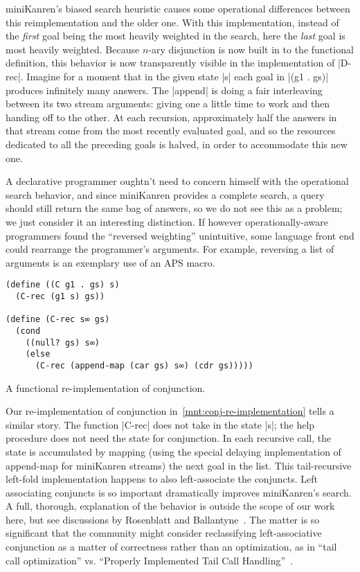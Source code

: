 \documentclass[sigplan,screen,draft,anonymous,review,natbib=false]{acmart}
\begin{document}
miniKanren's biased search heuristic causes some operational
differences between this reimplementation and the older one. With this
implementation, instead of the \emph{first} goal being the most
heavily weighted in the search, here the \emph{last} goal is most
heavily weighted. Because $n$-ary disjunction is now built in to the
functional definition, this behavior is now transparently visible in
the implementation of \rackinline|D-rec|. Imagine for a moment that in
the given state \rackinline|s| each goal in \rackinline|(g1 . gs)|
produces infinitely many answers. The \rackinline|append| is doing a
fair interleaving between its two stream arguments: giving one a
little time to work and then handing off to the other. At each
recursion, approximately half the answers in that stream come from the
most recently evaluated goal, and so the resources dedicated to all
the preceding goals is halved, in order to accommodate this new one.

A declarative programmer oughtn't need to concern himself with the
operational search behavior, and since miniKanren provides a complete
search, a query should still return the same bag of answers, so we do
not see this as a problem; we just consider it an interesting
distinction. If however operationally-aware programmers found the
\enquote{reversed weighting} unintuitive, some language front end
could rearrange the programmer's arguments. For example, reversing a
list of arguments is an exemplary use of an APS macro.

\begin{listing}
  \begin{verbatim}
(define ((C g1 . gs) s)
  (C-rec (g1 s) gs))

(define (C-rec s∞ gs)
  (cond
    ((null? gs) s∞)
    (else
      (C-rec (append-map (car gs) s∞) (cdr gs)))))
  \end{verbatim}
  \caption{A functional re-implementation of conjunction.}
  \label{mnt:conj-re-implementation}
\end{listing}

Our re-implementation of conjunction
in~\cref{mnt:conj-re-implementation} tells a similar story. The
function \rackinline|C-rec| does not take in the state \rackinline|s|;
the help procedure does not need the state for conjunction. In each
recursive call, the state is accumulated by mapping (using the special
delaying implementation of append-map for miniKanren streams) the next
goal in the list. This tail-recursive left-fold implementation happens
to also left-associate the conjuncts. Left associating conjuncts is so
important dramatically improves miniKanren's search. A full, thorough,
explanation of the behavior is outside the scope of our work here, but
see discussions by Rosenblatt and Ballantyne~\cite{here,nowhere}. The
matter is so significant that the community might consider
reclassifying left-associative conjunction as a matter of correctness
rather than an optimization, as in \enquote{tail call optimization}
vs. \enquote{Properly Implemented Tail Call
  Handling}~\cite{felleisen2014requestions}.
\end{document}
